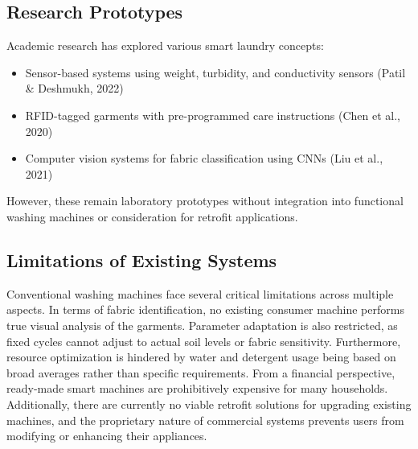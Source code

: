 \subsection{Research Prototypes}
Academic research has explored various smart laundry concepts:
\begin{itemize}
    \item Sensor-based systems using weight, turbidity, and conductivity sensors (Patil \& Deshmukh, 2022)
    \item RFID-tagged garments with pre-programmed care instructions (Chen et al., 2020)
    \item Computer vision systems for fabric classification using CNNs (Liu et al., 2021)
\end{itemize}
However, these remain laboratory prototypes without integration into functional washing machines or consideration for retrofit applications.

\subsection{Limitations of Existing Systems}
Conventional washing machines face several critical limitations across multiple aspects. In terms of fabric identification, no existing consumer machine performs true visual analysis of the garments. Parameter adaptation is also restricted, as fixed cycles cannot adjust to actual soil levels or fabric sensitivity. Furthermore, resource optimization is hindered by water and detergent usage being based on broad averages rather than specific requirements. From a financial perspective, ready-made smart machines are prohibitively expensive for many households. Additionally, there are currently no viable retrofit solutions for upgrading existing machines, and the proprietary nature of commercial systems prevents users from modifying or enhancing their appliances.

